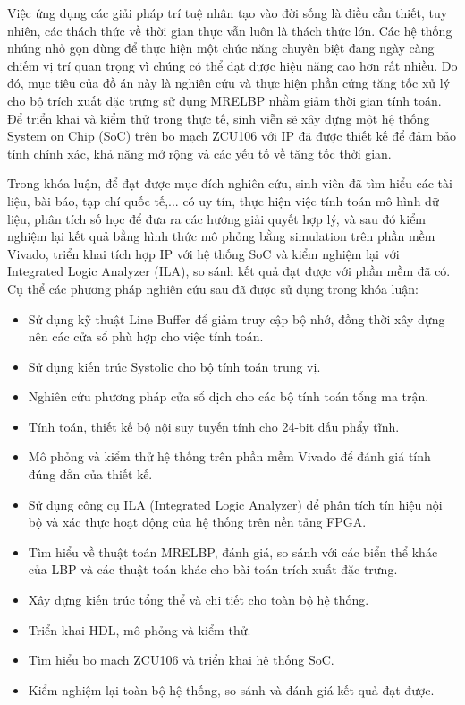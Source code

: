 Việc ứng dụng các giải pháp trí tuệ nhân tạo vào đời sống là điều cần thiết, tuy nhiên, các thách thức về thời gian thực vẫn luôn là thách thức lớn. Các hệ thống nhúng nhỏ gọn dùng để thực hiện một chức năng chuyên biệt đang ngày càng chiếm vị trí quan trọng vì chúng có thể đạt được hiệu năng cao hơn rất nhiều. Do đó, mục tiêu của đồ án này là nghiên cứu và thực hiện phần cứng tăng tốc xử lý cho bộ trích xuất đặc trưng sử dụng MRELBP nhằm giảm thời gian tính toán. Để triển khai và kiểm thử trong thực tế, sinh viễn sẽ xây dựng một hệ thống System on Chip (SoC) trên bo mạch ZCU106 với IP đã được thiết kế để đảm bảo tính chính xác, khả năng mở rộng và các yếu tố về tăng tốc thời gian.
\vspace{0.3cm}


\vspace{0.3cm}

Trong khóa luận, để đạt được mục đích nghiên cứu, sinh viên đã tìm
hiểu các tài liệu, bài báo, tạp chí quốc tế,... có uy tín, thực hiện việc tính toán mô hình dữ liệu, phân tích số học để đưa ra các hướng giải quyết hợp lý, và sau đó kiểm nghiệm lại kết quả bằng hình thức mô phỏng bằng simulation trên phần mềm Vivado, triển khai tích hợp IP với hệ thống SoC và kiểm nghiệm lại với Integrated Logic Analyzer (ILA), so sánh kết quả đạt được với phần mềm đã có.  Cụ thể các phương pháp nghiên cứu sau đã được sử dụng trong khóa luận:
\renewcommand{\labelitemi}{$-$}
\begin{itemize}
	\item Sử dụng kỹ thuật Line Buffer để giảm truy cập bộ nhớ, đồng thời xây dựng nên các cửa sổ phù hợp cho việc tính toán.
	\item Sử dụng kiến trúc Systolic cho bộ tính toán trung vị.
	\item Nghiên cứu phương pháp cửa sổ dịch cho các bộ tính toán tổng ma trận.
	\item Tính toán, thiết kế bộ nội suy tuyến tính cho 24-bit dấu phẩy tĩnh.
	\item Mô phỏng và kiểm thử hệ thống trên phần mềm Vivado để đánh giá tính đúng đắn của thiết kế.
	\item Sử dụng công cụ ILA (Integrated Logic Analyzer) để phân tích tín hiệu nội bộ và xác thực hoạt động của hệ thống trên nền tảng FPGA.
	 
\end{itemize} 
\renewcommand{\labelitemi}{$-$}
\begin{itemize}
	\item Tìm hiểu về thuật toán MRELBP, đánh giá, so sánh với các biển thể khác của LBP và các thuật toán khác cho bài toán trích xuất đặc trưng.
	\item Xây dựng kiến trúc tổng thể và chi tiết cho toàn bộ hệ thống.
	\item Triển khai HDL, mô phỏng và kiểm thử.
	\item Tìm hiểu bo mạch ZCU106 và triển khai hệ thống SoC.
	\item Kiểm nghiệm lại toàn bộ hệ thống, so sánh và đánh giá kết quả đạt được.
\end{itemize} 
\vspace{0.3cm}

